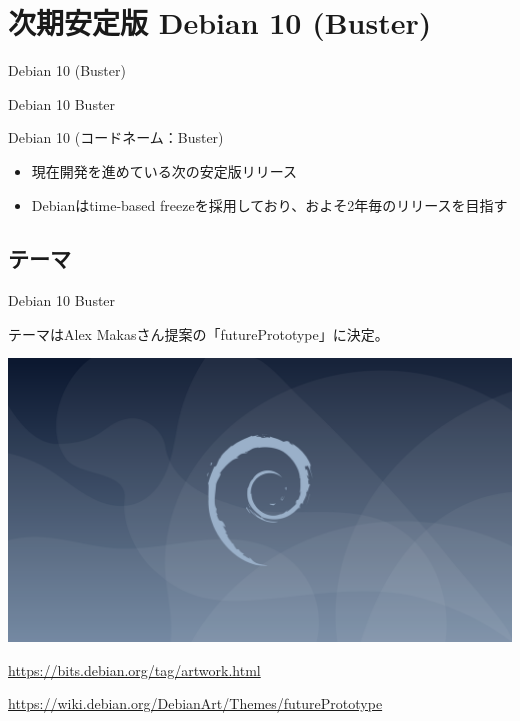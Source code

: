 
\section{次期安定版 Debian 10 (Buster)}

\begin{frame}
  \begin{center}\Huge{Debian 10 (Buster)}\end{center}
\end{frame}


\begin{frame}{Debian 10 Buster}%

Debian 10 (コードネーム：Buster)

\begin{itemize}
\item 現在開発を進めている次の安定版リリース
\item Debianはtime-based freezeを採用しており、およそ2年毎のリリースを目指す
\end{itemize}
  \begin{center}
  \end{center}
\end{frame}


\subsection{テーマ}


\begin{frame}{Debian 10 Buster}%

テーマはAlex Makasさん提案の「futurePrototype」に決定。
  
\begin{center}
  \includegraphics[width=0.75\hsize]{image201902/futurePrototype-wallpaper-1920x1080.png}
\end{center}

\url{https://bits.debian.org/tag/artwork.html}

\url{https://wiki.debian.org/DebianArt/Themes/futurePrototype}

\end{frame}


